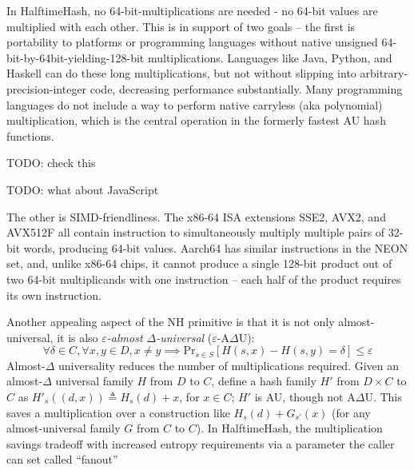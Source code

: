 \documentclass[acmsmall, nonacm]{acmart}
\begin{document}
In HalftimeHash, no 64-bit-mul\-ti\-pli\-ca\-tions are needed - no 64-bit values are multiplied with each other.
This is in support of two goals --
the first is portability to platforms or programming languages without native unsigned 64-bit-by-64bit-yielding-128-bit multiplications.
Languages like Java, Python, and Haskell can do these long multiplications, but not without slipping into arbitrary-precision-integer code, decreasing performance substantially.
Many programming languages do not include a way to perform native carryless (aka polynomial) multiplication, which is the central operation in the formerly fastest AU hash functions. \cite{umash,clhash}

TODO: check this

TODO: what about JavaScript

The other is SIMD-friendliness.
The x86-64 ISA extensions SSE2, AVX2, and AVX512F all contain instruction to simultaneously multiply multiple pairs of 32-bit words, producing 64-bit values.
Aarch64 has similar instructions in the NEON set, and, unlike x86-64 chips, it cannot produce a single 128-bit product out of two 64-bit multiplicands with one instruction -- each half of the product requires its own instruction.



Another appealing aspect of the NH primitive is that it is not only almost-universal, it is also {\em$ \varepsilon$-almost $\Delta$-universal} ($\varepsilon$-A$\Delta$U):
\[\forall \delta \in C, \forall x,y \in D, x \neq y \implies \mathrm{Pr}_{s \in S}[H(s, x) - H(s, y) = \delta] \leq \varepsilon \]
Almost-$\Delta$ universality reduces the number of multiplications required.
Given an almost-$\Delta$ universal family $H$ from $D$ to $C$, define a hash family $H'$ from $D \times C$ to $C$ as $H'_s ((d, x)) \triangleq H_s(d) + x$, for $x \in C$; $H'$ is AU, though not A$\Delta$U.
This saves a multiplication over a construction like $H_s(d) + G_{s'}(x)$ (for any almost-universal family $G$ from $C$ to $C$).
In HalftimeHash, the multiplication savings tradeoff with increased entropy requirements via a parameter the caller can set called ``fanout''
\end{document}
